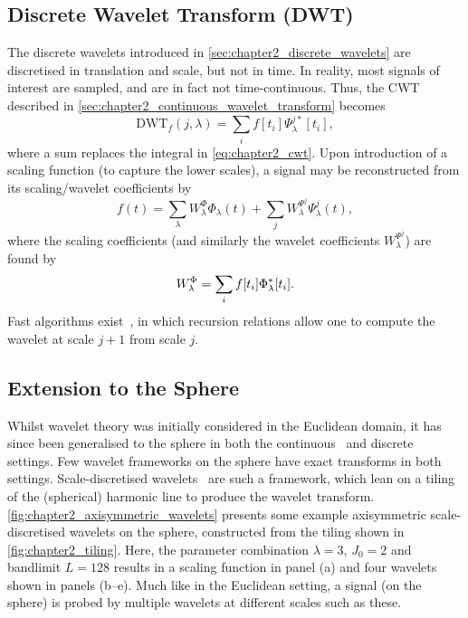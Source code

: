 \subsection{Discrete Wavelet Transform (DWT)}

The discrete wavelets introduced in \cref{sec:chapter2_discrete_wavelets} are discretised in translation and scale, but not in time.
In reality, most signals of interest are sampled, and are in fact not time-continuous.
Thus, the CWT described in \cref{sec:chapter2_continuous_wavelet_transform} becomes
%
\begin{equation}
    \text{DWT}_{f}(j,\lambda)
    = \sum\limits_{i} f[t_{i}] \Psi^{j\ast}_{\lambda}[t_{i}],
\end{equation}
%
where a sum replaces the integral in \cref{eq:chapter2_cwt}.
Upon introduction of a scaling function (to capture the lower scales), a signal may be reconstructed from its scaling/wavelet coefficients by
%
\begin{equation}
    f(t)
    = \sum\limits_{\lambda} W^{\Phi}_{\lambda} \Phi_{\lambda}(t)
    + \sum\limits_{j} W^{\Psi^{j}}_{\lambda} \Psi^{j}_{\lambda}(t),
\end{equation}
%
where the scaling coefficients (and similarly the wavelet coefficients \(W^{\Psi^{j}}_{\lambda}\)) are found by
%
\begin{equation}
    W^{\Phi}_{\lambda}
    = \sum\limits_{i} f[t_{i}] \Phi^{\ast}_{\lambda}[t_{i}].
\end{equation}
%
Fast algorithms exist~\cite{Beylkin1991,Rioul1992}, in which recursion relations allow one to compute the wavelet at scale \(j+1\) from scale \(j\).

\subsection{Extension to the Sphere}\label{sec:chapter2_extension_sphere}

Whilst wavelet theory was initially considered in the Euclidean domain, it has since been generalised to the sphere in both the continuous~\cite{Torresani1995,Holschneider1996,Freeden1997,Antoine1998,Antoine1999,Antoine2002,Demanet2003,Wiaux2005,Sanz2006,McEwen2006} and discrete~\cite{Sweldens1996,Schroder2000,Wiaux2005,Starck2006,Wiaux2008,Starck2009,Leistedt2013,McEwen2019,McEwen2018} settings.
Few wavelet frameworks on the sphere have exact transforms in both settings.
Scale-discretised wavelets~\cite{Wiaux2008,McEwen2018,Leistedt2013,McEwen2013,McEwen2015} are such a framework, which lean on a tiling of the (spherical) harmonic line to produce the wavelet transform.
\cref{fig:chapter2_axisymmetric_wavelets} presents some example axisymmetric scale-discretised wavelets on the sphere, constructed from the tiling shown in \cref{fig:chapter2_tiling}.
Here, the parameter combination \(\lambda=3\), \(J_{0}=2\) and bandlimit \(L=128\) results in a scaling function in panel (a) and four wavelets shown in panels (b--e). %
Much like in the Euclidean setting, a signal (on the sphere) is probed by multiple wavelets at different scales such as these.

